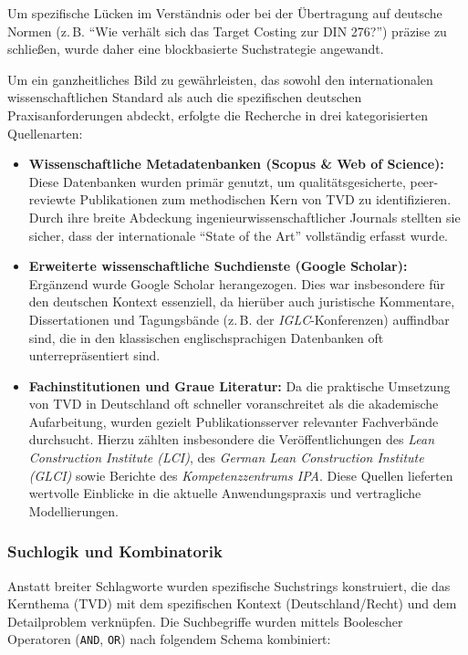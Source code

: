 Um spezifische Lücken im Verständnis oder bei der Übertragung auf deutsche Normen (z.\,B. \enquote{Wie verhält sich das Target Costing zur DIN 276?}) präzise zu schließen, wurde daher eine blockbasierte Suchstrategie angewandt.


Um ein ganzheitliches Bild zu gewährleisten, das sowohl den internationalen wissenschaftlichen Standard als auch die spezifischen deutschen Praxisanforderungen abdeckt, erfolgte die Recherche in drei kategorisierten Quellenarten:

\begin{itemize}
    \item \textbf{Wissenschaftliche Metadatenbanken (Scopus \& Web of Science):}
    Diese Datenbanken wurden primär genutzt, um qualitätsgesicherte, peer-reviewte Publikationen zum methodischen Kern von \acs{TVD} zu identifizieren. Durch ihre breite Abdeckung ingenieurwissenschaftlicher Journals stellten sie sicher, dass der internationale \enquote{State of the Art} vollständig erfasst wurde.

    \item \textbf{Erweiterte wissenschaftliche Suchdienste (Google Scholar):}
    Ergänzend wurde Google Scholar herangezogen. Dies war insbesondere für den deutschen Kontext essenziell, da hierüber auch juristische Kommentare, Dissertationen und Tagungsbände (z.\,B. der \textit{IGLC}-Konferenzen) auffindbar sind, die in den klassischen englischsprachigen Datenbanken oft unterrepräsentiert sind.

    \item \textbf{Fachinstitutionen und Graue Literatur:}
    Da die praktische Umsetzung von \acs{TVD} in Deutschland oft schneller voranschreitet als die akademische Aufarbeitung, wurden gezielt Publikationsserver relevanter Fachverbände durchsucht. Hierzu zählten insbesondere die Veröffentlichungen des \textit{Lean Construction Institute (\acs{LCI})}, des \textit{German Lean Construction Institute (\acs{GLCI})} sowie Berichte des \textit{Kompetenzzentrums \acs{IPA}}. Diese Quellen lieferten wertvolle Einblicke in die aktuelle Anwendungspraxis und vertragliche Modellierungen.
\end{itemize}

\subsubsection*{Suchlogik und Kombinatorik}
Anstatt breiter Schlagworte wurden spezifische Suchstrings konstruiert, die das Kernthema (\acs{TVD}) mit dem spezifischen Kontext (Deutschland/Recht) und dem Detailproblem verknüpfen. Die Suchbegriffe wurden mittels Boolescher Operatoren (\texttt{AND}, \texttt{OR}) nach folgendem Schema kombiniert:

